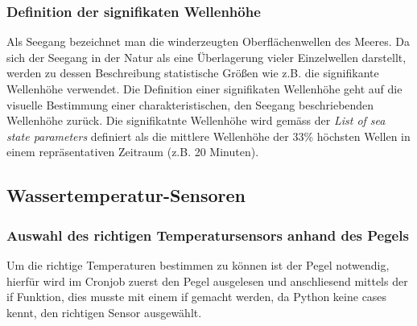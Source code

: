 \subsubsection{Definition der signifikaten Wellenhöhe}
Als Seegang bezeichnet man die winderzeugten Oberflächenwellen des Meeres. Da sich der Seegang in der Natur als eine Überlagerung vieler Einzelwellen darstellt, werden zu dessen Beschreibung statistische Größen wie z.B. die signifikante Wellenhöhe verwendet. Die Definition einer signifikaten Wellenhöhe geht auf die visuelle Bestimmung einer charakteristischen, den Seegang beschriebenden Wellenhöhe zurück. Die signifikatnte Wellenhöhe wird gemäss der \textit{List of sea state parameters}\cite{1986Iahr} definiert als die mittlere Wellenhöhe der 33\% höchsten Wellen in einem repräsentativen Zeitraum (z.B. 20 Minuten).







\subsection{Wassertemperatur-Sensoren}
\newline
{}\newline
{}\newline
{}\newline


\subsubsection*{Auswahl des richtigen Temperatursensors anhand des Pegels}
\newline
{}\newline
Um die richtige Temperaturen bestimmen zu können ist der Pegel notwendig, hierfür wird im Cronjob zuerst den Pegel ausgelesen und anschliesend mittels der if Funktion, dies musste mit einem if gemacht werden, da Python keine cases kennt, den richtigen Sensor ausgewählt.




